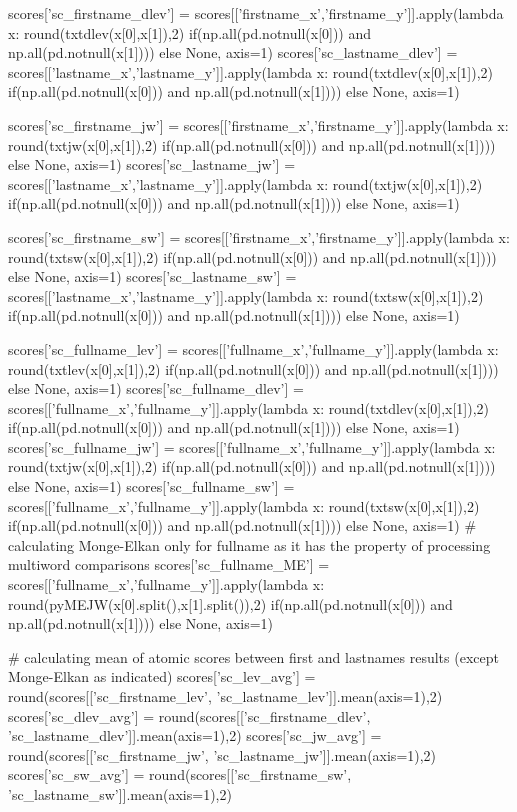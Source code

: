 \documentclass[a4paper,12pt,twoside]{book}
\begin{document}
\begin{python}
  scores['sc_firstname_dlev'] = scores[['firstname_x','firstname_y']].apply(lambda x: round(txtdlev(x[0],x[1]),2) if(np.all(pd.notnull(x[0])) and np.all(pd.notnull(x[1]))) else None, axis=1)
  scores['sc_lastname_dlev'] = scores[['lastname_x','lastname_y']].apply(lambda x: round(txtdlev(x[0],x[1]),2) if(np.all(pd.notnull(x[0])) and np.all(pd.notnull(x[1]))) else None, axis=1)

  scores['sc_firstname_jw'] = scores[['firstname_x','firstname_y']].apply(lambda x: round(txtjw(x[0],x[1]),2) if(np.all(pd.notnull(x[0])) and np.all(pd.notnull(x[1]))) else None, axis=1)
  scores['sc_lastname_jw'] = scores[['lastname_x','lastname_y']].apply(lambda x: round(txtjw(x[0],x[1]),2) if(np.all(pd.notnull(x[0])) and np.all(pd.notnull(x[1]))) else None, axis=1)

  scores['sc_firstname_sw'] = scores[['firstname_x','firstname_y']].apply(lambda x: round(txtsw(x[0],x[1]),2) if(np.all(pd.notnull(x[0])) and np.all(pd.notnull(x[1]))) else None, axis=1)
  scores['sc_lastname_sw'] = scores[['lastname_x','lastname_y']].apply(lambda x: round(txtsw(x[0],x[1]),2) if(np.all(pd.notnull(x[0])) and np.all(pd.notnull(x[1]))) else None, axis=1)

  scores['sc_fullname_lev'] = scores[['fullname_x','fullname_y']].apply(lambda x: round(txtlev(x[0],x[1]),2) if(np.all(pd.notnull(x[0])) and np.all(pd.notnull(x[1]))) else None, axis=1)
  scores['sc_fullname_dlev'] = scores[['fullname_x','fullname_y']].apply(lambda x: round(txtdlev(x[0],x[1]),2) if(np.all(pd.notnull(x[0])) and np.all(pd.notnull(x[1]))) else None, axis=1)
  scores['sc_fullname_jw'] = scores[['fullname_x','fullname_y']].apply(lambda x: round(txtjw(x[0],x[1]),2) if(np.all(pd.notnull(x[0])) and np.all(pd.notnull(x[1]))) else None, axis=1)
  scores['sc_fullname_sw'] = scores[['fullname_x','fullname_y']].apply(lambda x: round(txtsw(x[0],x[1]),2) if(np.all(pd.notnull(x[0])) and np.all(pd.notnull(x[1]))) else None, axis=1)
  # calculating Monge-Elkan only for fullname as it has the property of processing multiword comparisons
  scores['sc_fullname_ME'] = scores[['fullname_x','fullname_y']].apply(lambda x: round(pyMEJW(x[0].split(),x[1].split()),2) if(np.all(pd.notnull(x[0])) and np.all(pd.notnull(x[1]))) else None, axis=1)

  # calculating mean of atomic scores between first and lastnames results (except Monge-Elkan as indicated)
  scores['sc_lev_avg'] = round(scores[['sc_firstname_lev', 'sc_lastname_lev']].mean(axis=1),2)
  scores['sc_dlev_avg'] = round(scores[['sc_firstname_dlev', 'sc_lastname_dlev']].mean(axis=1),2)
  scores['sc_jw_avg'] = round(scores[['sc_firstname_jw', 'sc_lastname_jw']].mean(axis=1),2)
  scores['sc_sw_avg'] = round(scores[['sc_firstname_sw', 'sc_lastname_sw']].mean(axis=1),2)


\end{python}
\end{document}
